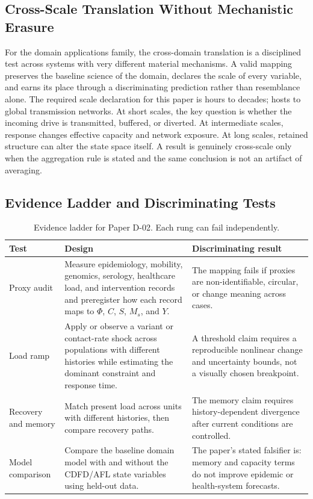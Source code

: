 \documentclass[11pt,a4paper]{article}
\begin{document}
\subsection{Cross-Scale Translation Without Mechanistic Erasure}

For the domain applications family, the cross-domain translation is a disciplined test across systems with very different material mechanisms. A valid mapping preserves the baseline science of the domain, declares the scale of every variable, and earns its place through a discriminating prediction rather than resemblance alone. \cite{Holling1973,Turing1952,Shannon1948,BakTangWiesenfeld1987}
The required scale declaration for this paper is hours to decades; hosts to global transmission networks. At short
scales, the key question is whether the incoming drive is transmitted,
buffered, or diverted. At intermediate scales, response changes effective
capacity and network exposure. At long scales, retained structure can alter the
state space itself. A result is genuinely cross-scale only when the aggregation
rule is stated and the same conclusion is not an artifact of averaging.

\subsection{Evidence Ladder and Discriminating Tests}

\begin{table}[htbp]
\centering
\small
\caption{Evidence ladder for Paper D-02. Each rung can fail independently.}
\begin{tabularx}{\textwidth}{|p{}|X|X|}
\hline
\textbf{Test} & \textbf{Design} & \textbf{Discriminating result} \\
\hline
Proxy audit & Measure epidemiology, mobility, genomics, serology, healthcare load, and intervention records and preregister how each record maps to $\Phi$, $C$, $S$, $M_s$, and $Y$. & The mapping fails if proxies are non-identifiable, circular, or change meaning across cases. \\
\hline
Load ramp & Apply or observe a variant or contact-rate shock across populations with different histories while estimating the dominant constraint and response time. & A threshold claim requires a reproducible nonlinear change and uncertainty bounds, not a visually chosen breakpoint. \\
\hline
Recovery and memory & Match present load across units with different histories, then compare recovery paths. & The memory claim requires history-dependent divergence after current conditions are controlled. \\
\hline
Model comparison & Compare the baseline domain model with and without the CDFD/AFL state variables using held-out data. & The paper's stated falsifier is: memory and capacity terms do not improve epidemic or health-system forecasts. \\
\hline
\end{tabularx}
\end{table}
\end{document}
